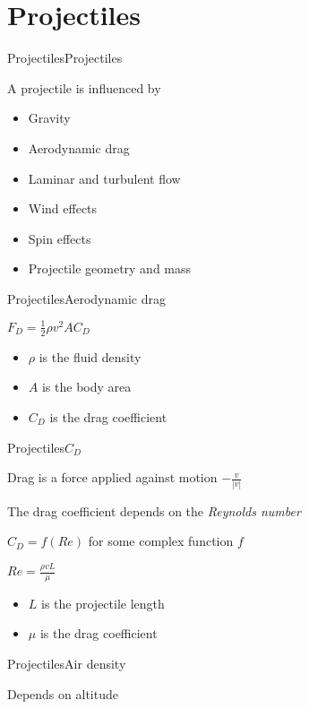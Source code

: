 \documentclass{beamer}
\begin{document}
\section{Projectiles}
\begin{slide}{Projectiles}{Projectiles}{
\item A projectile is influenced by
\begin{itemize}
\item Gravity
\item Aerodynamic drag
\item Laminar and turbulent flow
\item Wind effects
\item Spin effects
\item Projectile geometry and mass
\end{itemize}
}\end{slide}

\begin{slide}{Projectiles}{Aerodynamic drag}{
\item $F_D = \frac{1}{2} \rho v^2 A C_D$
\begin{itemize}
\item $\rho$ is the fluid density
\item $A$ is the body area
\item $C_D$ is the drag coefficient
\end{itemize}
}\end{slide}

\begin{slide}{Projectiles}{$C_D$}{
\item Drag is a force applied against motion $-\frac{v}{|v|}$
\item The drag coefficient depends on the \textit{Reynolds number}
\item $C_D = f(Re)$ for some complex function $f$
\item $Re = \frac{\rho v L}{\mu}$
\begin{itemize}
\item $L$ is the projectile length
\item $\mu$ is the drag coefficient
\end{itemize}
}\end{slide}


\begin{slide}{Projectiles}{Air density}{
\item Depends on altitude
}\end{slide}
\end{document}
